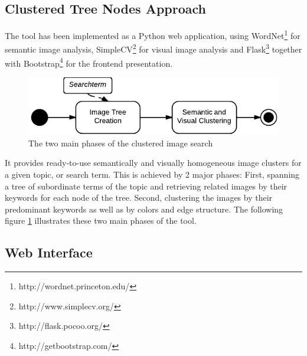 \subsection{Clustered Tree Nodes Approach}
The tool has been implemented as a Python web application, using WordNet\footnote{http://wordnet.princeton.edu/} for semantic image analysis, SimpleCV\footnote{http://www.simplecv.org/} for visual image analysis and Flask\footnote{http://flask.pocoo.org/} together with Bootstrap\footnote{http://getbootstrap.com/} for the frontend presentation.\\
\begin{figure}[h]
\centering
\includegraphics[]{images/search_process_highlevel.pdf}
\caption{The two main phases of the clustered image search}
\label{fig_overallprocess}
\end{figure}

It provides ready-to-use semantically and visually homogeneous image clusters for a given topic, or search term. This is achieved by 2 major phases: First, spanning a tree of subordinate terms of the topic and retrieving related images by their keywords for each node of the tree. Second, clustering the images by their predominant keywords as well as by colors and edge structure. The following figure \ref{fig_overallprocess} illustrates these two main phases of the tool.

\subsection{Web Interface}

